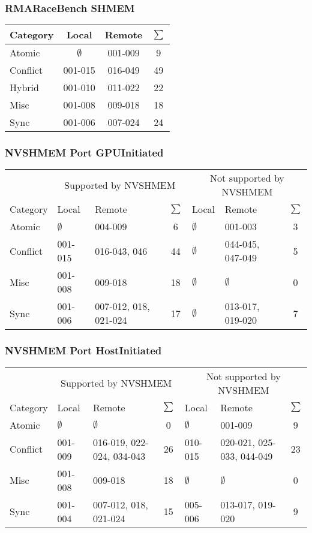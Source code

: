 \documentclass[a4paper,10pt]{article}
\newcommand{\es}{$\emptyset$}
\newcommand{\s}{$\sum$}
\begin{document}
\subsubsection*{RMARaceBench SHMEM}
\begin{tabular}{|l|c|c|c|} \hline
    Category & Local & Remote & \s \\ \hline
    Atomic & \es & 001-009 & 9 \\
    Conflict & 001-015 & 016-049 & 49 \\
    Hybrid & 001-010 & 011-022 & 22 \\
    Misc & 001-008 & 009-018 & 18 \\
    Sync & 001-006 & 007-024 & 24 \\ \hline
\end{tabular}

\subsubsection*{NVSHMEM Port GPUInitiated}
\begin{tabular}{|l|l|l|c|l|l|c|} \hline
    & \multicolumn{3}{c}{Supported by NVSHMEM} & \multicolumn{3}{|c|}{Not supported by NVSHMEM} \\
    Category & Local & Remote & \s & Local & Remote & \s \\ \hline
    Atomic & \es & 004-009 & 6 & \es & 001-003 & 3 \\
    Conflict & 001-015 & 016-043, 046 & 44 & \es & 044-045, 047-049 & 5 \\
    Misc & 001-008 & 009-018 & 18 & \es & \es & 0 \\
    Sync & 001-006 & 007-012, 018, 021-024 & 17 & \es & 013-017, 019-020 & 7 \\ \hline
\end{tabular}

\subsubsection*{NVSHMEM Port HostInitiated}
\begin{tabular}{|l|l|l|c|l|l|c|} \hline
    & \multicolumn{3}{c}{Supported by NVSHMEM} & \multicolumn{3}{|c|}{Not supported by NVSHMEM} \\
    Category & Local & Remote & \s & Local & Remote & \s \\ \hline
    Atomic & \es & \es & 0 & \es & 001-009 & 9 \\
    Conflict & 001-009 & 016-019, 022-024, 034-043 & 26 & 010-015 & 020-021, 025-033, 044-049 & 23 \\
    Misc & 001-008 & 009-018 & 18 & \es & \es & 0 \\
    Sync & 001-004 & 007-012, 018, 021-024 & 15 & 005-006 & 013-017, 019-020 & 9 \\ \hline
\end{tabular}
\end{document}
